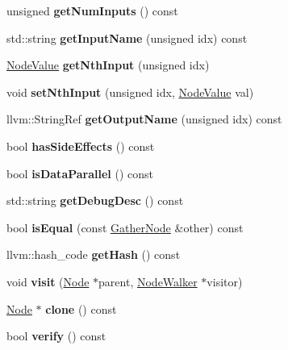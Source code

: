 \begin{DoxyCompactItemize}
unsigned {\bfseries get\+Num\+Inputs} () const
\item 
\mbox{\label{classglow_1_1_gather_node_ab14d40bc554f4d9355843290353f354c}} 
std\+::string {\bfseries get\+Input\+Name} (unsigned idx) const
\item 
\mbox{\label{classglow_1_1_gather_node_ad87f334f0f88be9b6d6f508d0e5bfce9}} 
\hyperlink{structglow_1_1_node_value}{Node\+Value} {\bfseries get\+Nth\+Input} (unsigned idx)
\item 
\mbox{\label{classglow_1_1_gather_node_a1aa472b90239158504011f2129272233}} 
void {\bfseries set\+Nth\+Input} (unsigned idx, \hyperlink{structglow_1_1_node_value}{Node\+Value} val)
\item 
\mbox{\label{classglow_1_1_gather_node_a02135a3fb4b3e1977db85b7cc7ca087b}} 
llvm\+::\+String\+Ref {\bfseries get\+Output\+Name} (unsigned idx) const
\item 
\mbox{\label{classglow_1_1_gather_node_a57a6ff64a539476d29285075b76811c0}} 
bool {\bfseries has\+Side\+Effects} () const
\item 
\mbox{\label{classglow_1_1_gather_node_a48ff34a0b06e12d0696e173cbda7a38d}} 
bool {\bfseries is\+Data\+Parallel} () const
\item 
\mbox{\label{classglow_1_1_gather_node_a084c2e61f5ba6f6af7a4818d5d71ab5d}} 
std\+::string {\bfseries get\+Debug\+Desc} () const
\item 
\mbox{\label{classglow_1_1_gather_node_ace4b4a3c0166d7e53966a56a6e1aeda6}} 
bool {\bfseries is\+Equal} (const \hyperlink{classglow_1_1_gather_node}{Gather\+Node} \&other) const
\item 
\mbox{\label{classglow_1_1_gather_node_af37117ebb20fdd7da1cb0c6d64183f22}} 
llvm\+::hash\+\_\+code {\bfseries get\+Hash} () const
\item 
\mbox{\label{classglow_1_1_gather_node_a68cc3100ecb528c5b4fa9314ab3e01fc}} 
void {\bfseries visit} (\hyperlink{classglow_1_1_node}{Node} $\ast$parent, \hyperlink{classglow_1_1_node_walker}{Node\+Walker} $\ast$visitor)
\item 
\mbox{\label{classglow_1_1_gather_node_a635de050c4725a8ce1cce4ef4b90523b}} 
\hyperlink{classglow_1_1_node}{Node} $\ast$ {\bfseries clone} () const
\item 
\mbox{\label{classglow_1_1_gather_node_a39c22715580e98188caa62d42a300319}} 
bool {\bfseries verify} () const
\end{DoxyCompactItemize}
